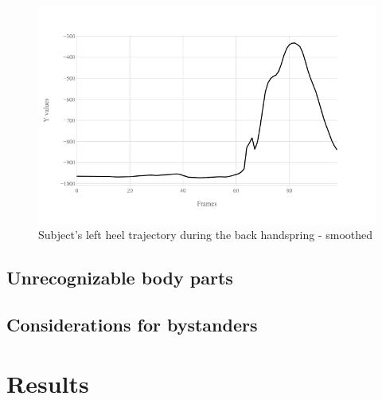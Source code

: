 \begin{figure}[htb]
  \centering
    \includegraphics[width=\textwidth,keepaspectratio]
    {images/data-preprocessing/flack-17-rasmus-l-heel-y-smoothed}
    \caption{Subject's left heel trajectory during the back handspring - smoothed}
    \label{lack-17-rasmus-l-heel-y-smoothed}
\end{figure}

\subsection{Unrecognizable body parts}

\subsection{Considerations for bystanders}

\section{Results}
\label{pre-processing-results}



